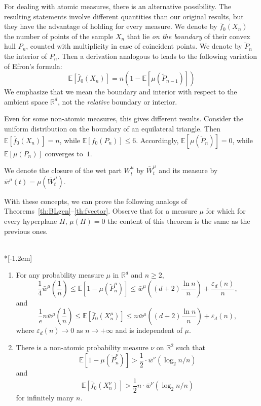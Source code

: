 \documentclass[AHL,Unicode,longabstracts]{cedram}
\newcommand{\Rbb}{\mathbb{R}}%
\newcommand{\Ebb}{\mathbb{E}}%
\newcommand{\ptb}[1]{\left[#1 \right]}
\newcommand*{\mtfrac}[2]{\frac{#1}{#2}}%
\newcommand*{\romanenumi}{\renewcommand*{\theenumi}{\roman{enumi}}}
\begin{document}
For dealing with atomic measures, there is an alternative possibility. The resulting statements involve different quantities than our original results, but they have the advantage of holding for every measure. We denote by $\bar f_0(X_n)$ the number of points of the sample $X_n$ that lie \emph{on the boundary} of their convex hull $P_n $, counted with multiplicity in case of coincident points. We denote by $\breve P_n $ the interior of $P_n $. Then a derivation analogous to \thetag{\ref{eq:Efron0}--\ref{eq:Efron}} leads to the following variation of
Efron's formula: %
\begin{equation}\label{eq:Ef-open}
\Ebb [\bar f_0(X_n)] =n(1-\Ebb [\mu(\breve P_{n-1})])
\end{equation}
We emphasize that we mean the boundary and interior with respect to the ambient space $\Rbb^d$, not the \emph{relative} boundary or interior.

Even for some non-atomic measures, this gives different results. Consider the uniform distribution on the boundary of an equilateral triangle. Then $\Ebb[\bar f_0(X_n)]=n$, while $\Ebb[f_0(P_n)]\le 6$. Accordingly, $\Ebb [\mu(\breve P_{n})]=0$, while $\Ebb [\mu(P_{n})]$ converges to~$1$.

We denote the closure of the wet part $W_t^{\mu}$ by $\bar W_t^{\mu}$ and its measure by $\bar w^{\mu}(t)=\mu(\bar W_t^{\mu})$.

With these concepts, we can prove the following analogs of Theorems~\ref{th:BLgen}--\ref{th:fvector}. Observe that for a measure $\mu$ for which for every hyperplane $H$, $\mu(H)=0$ the content of this theorem is the same as the previous ones.

\begin{theo}\ \\*[-1.2em]
\begin{enumerate}\romanenumi
\item \label{list.5.1.1} For any probability measure $\mu$ in $\Rbb^d$ and $n \ge 2$,
\begin{equation}\label{eq:closed-wet}
\mtfrac 14 \bar w^{\mu}\left(\mtfrac1n\right) \le {\Ebb[1-\mu(\breve P_n^\mu)]} \le
\bar w^{\mu}\left((d+2)\mtfrac{\ln n}n\right) + \mtfrac{\varepsilon_d(n)}{n},
\end{equation}
and
\begin{equation}\label{eq:boundary-f0}
\mtfrac 1e n \bar w^{\mu}\left(\mtfrac1n\right) \le \Ebb\ptb{\bar f_0(X_n^\mu)} \le n \bar w^{\mu}\left({(d+2)\mtfrac{\ln n}n}\right) + \varepsilon_d(n),
\end{equation}
where $\varepsilon_d(n)\to 0$ as $n\to+\infty$ and is independent of $\mu$.
\item \label{list.5.1.2} There is a non-atomic probability measure $\nu$ on $\Rbb^2$ such that
\[
\Ebb[1-\mu(\breve P_n^\nu)] > \mtfrac 1{2} \cdot
\bar w^\nu(\log_2 n/ n)
\]
and
\[
\Ebb\ptb{\bar f_0(X_n^\nu)} > \mtfrac 1{2} n \cdot
\bar w^\nu({\log_2 n/ n})
\]
for infinitely many $n$.
\end{enumerate}
\end{theo}
\end{document}
